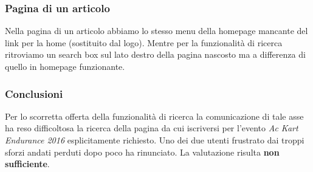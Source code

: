		\subsubsection{Pagina di un articolo}
			Nella pagina di un articolo abbiamo lo stesso menu della homepage mancante del link per la home (sostituito dal logo). Mentre per la funzionalità di ricerca ritroviamo un search box sul lato destro della pagina nascosto ma a differenza di quello in homepage funzionante.
			
		\subsubsection{Conclusioni}
			Per lo scorretta offerta della funzionalità di ricerca la comunicazione di tale asse ha reso difficoltosa la ricerca della pagina da cui iscriversi per l'evento \textit{Ac Kart Endurance 2016} esplicitamente richiesto. Uno dei due utenti frustrato dai troppi sforzi andati perduti dopo poco ha rinunciato. La valutazione risulta \textbf{non sufficiente}.